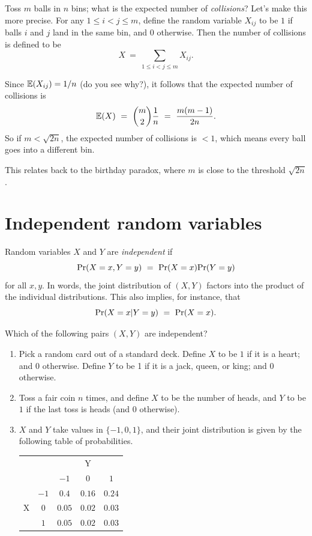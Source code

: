 Toss $m$ balls in $n$ bins; what is the expected number of {\it collisions}? Let's make
this more precise. For any $1 \leq i < j \leq m$, define the random variable $X_{ij}$ to
be $1$ if balls $i$ and $j$ land in the same bin, and $0$ otherwise. Then the
number of collisions is defined to be
$$ X  \ = \ \sum_{1 \leq i < j \leq m} X_{ij} .$$

Since $\mathbb{E}(X_{ij}) = 1/n$ (do you see why?), it follows that the expected number of 
collisions is 
$$ \E(X) \ = \ {m \choose 2} \frac{1}{n} \ = \ \frac{m(m-1)}{2n} .$$
So if $m < \sqrt{2n}$, the expected number of collisions is $< 1$, which means
every ball goes into a different bin. 

This relates back to the birthday paradox, where $m$ is close to the threshold $\sqrt{2n}$.

\section{Independent random variables}

Random variables $X$ and $Y$ are {\it independent} if
$$ \mbox{\rm Pr}(X=x, Y=y) \ = \ \mbox{\rm Pr}(X=x) \mbox{\rm Pr}(Y=y) $$
for all $x,y$. In words, the joint distribution of $(X,Y)$ factors into the product
of the individual distributions. This also implies, for instance, that
$$ \mbox{\rm Pr}(X = x | Y = y) \ = \ \mbox{\rm Pr}(X=x) .$$

Which of the following pairs $(X,Y)$ are independent?
\begin{enumerate}
\item Pick a random card out of a standard deck. Define $X$ to be $1$ if it is a heart;
 and $0$ otherwise. Define $Y$ to be 1 if it is a jack, queen, or king; and $0$ otherwise.
\item Toss a fair coin $n$ times, and define $X$ to be the number of heads, and $Y$ to 
be $1$ if the last toss is heads (and $0$ otherwise).
\item $X$ and $Y$ take values in $\{-1,0,1\}$, and their joint distribution is given by 
the following table of probabilities.

\begin{center}
\begin{tabular}{|cc|ccc|} \hline
\multicolumn{2}{|c|}{} & \multicolumn{3}{c|}{Y} \\ 
\multicolumn{2}{|c|}{}        & $-1$   & $0$    & $1$ \\ \hline
\multirow{3}{*}{X}     & $-1$ & $0.4$  & $0.16$ & $0.24$ \\ 
                       & $0$  & $0.05$ & $0.02$ & $0.03$ \\ 
                       & $1$  & $0.05$ & $0.02$ & $0.03$ \\ \hline
\end{tabular} 
\end{center}
\end{enumerate}

